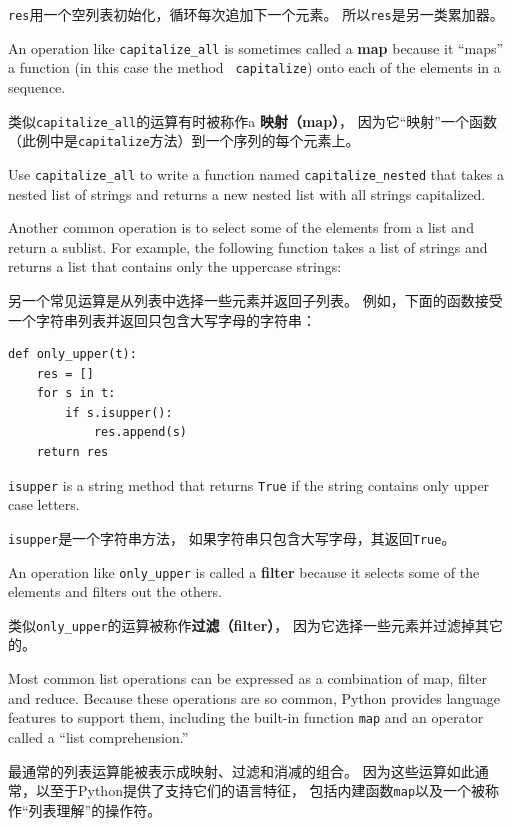 \documentclass[10pt]{book}
\begin{document}
\begin{CJK}{UTF8}{gbsn}
{\tt res}用一个空列表初始化，循环每次追加下一个元素。
所以{\tt res}是另一类累加器。

An operation like \verb"capitalize_all" is sometimes called a {\bf
map} because it ``maps'' a function (in this case the method {\tt
capitalize}) onto each of the elements in a sequence.

类似\verb"capitalize_all"的运算有时被称作a {\bf 映射（map）}，
因为它``映射''一个函数（此例中是{\tt capitalize}方法）到一个序列的每个元素上。

\begin{exercise}

Use \verb"capitalize_all" to write a function named \verb"capitalize_nested"
that takes a nested list of strings and returns a new nested list
with all strings capitalized.

\end{exercise}

Another common operation is to select some of the elements from
a list and return a sublist.  For example, the following
function takes a list of strings and returns a list that contains
only the uppercase strings:

另一个常见运算是从列表中选择一些元素并返回子列表。
例如，下面的函数接受一个字符串列表并返回只包含大写字母的字符串：

\begin{verbatim}
def only_upper(t):
    res = []
    for s in t:
        if s.isupper():
            res.append(s)
    return res
\end{verbatim}
%
{\tt isupper} is a string method that returns {\tt True} if
the string contains only upper case letters.

{\tt isupper}是一个字符串方法，
如果字符串只包含大写字母，其返回{\tt True}。

An operation like \verb"only_upper" is called a {\bf filter} because
it selects some of the elements and filters out the others.

类似\verb"only_upper"的运算被称作{\bf 过滤（filter）}，
因为它选择一些元素并过滤掉其它的。

Most common list operations can be expressed as a combination
of map, filter and reduce.  Because these operations are
so common, Python provides language features to support them,
including the built-in function {\tt map} and an operator
called a ``list comprehension.''

最通常的列表运算能被表示成映射、过滤和消减的组合。
因为这些运算如此通常，以至于Python提供了支持它们的语言特征，
包括内建函数{\tt map}以及一个被称作``列表理解''的操作符。


\end{CJK}
\end{document}
